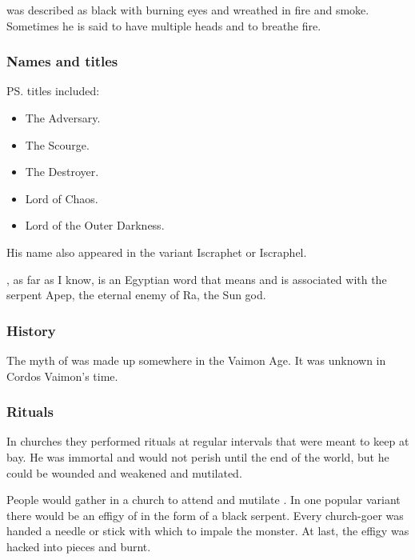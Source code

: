 \Isphet was described as black with burning eyes and wreathed in fire and smoke. 
Sometimes he is said to have multiple heads and to breathe fire. 





\subsubsection{Names and titles}
\ps{\Isphet} titles included:
\begin{itemize}
  \item The Adversary.
  \item The Scourge.
  \item The Destroyer.
  \item Lord of Chaos.
  \item Lord of the Outer Darkness.
\end{itemize}

His name also appeared in the variant Iscraphet or Iscraphel. 

, as far as I know, is an Egyptian word that means  and is associated with the serpent Apep, the eternal enemy of Ra, the Sun god. 






\subsubsection{History}
The myth of \Isphet was made up somewhere in the Vaimon Age. 
It was unknown in Cordos Vaimon's time. 





\subsubsection{Rituals}
In churches they performed rituals at regular intervals that were meant to keep \Isphet at bay.
He was immortal and would not perish until the end of the world, but he could be wounded and weakened and mutilated.

People would gather in a church to attend  and mutilate \Isphet. 
In one popular variant there would be an effigy of \Isphet in the form of a black serpent. 
Every church-goer was handed a needle or stick with which to impale the monster. 
At last, the effigy was hacked into pieces and burnt. 





